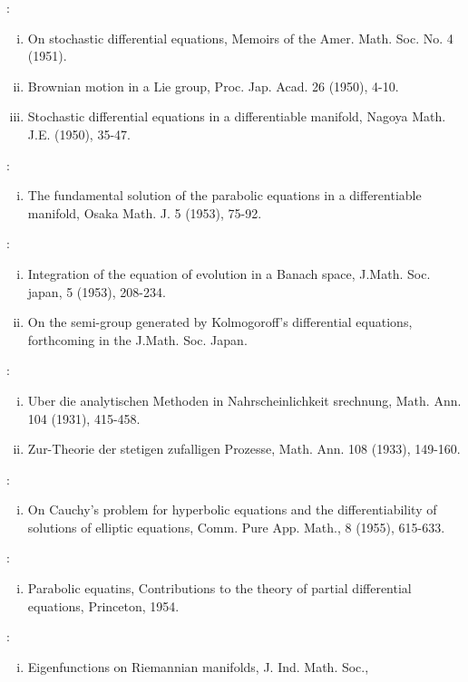 \begin{thebibliography}{99}
\begin{enumerate}[(i)]
 \end{enumerate}
: 
 \begin{enumerate}[(i)]
 \item On stochastic differential equations, Memoirs of the
  Amer. Math. Soc. No. 4 (1951). 
 \item Brownian motion in a Lie group, Proc. Jap. Acad. 26 (1950), 4-10.
 \item Stochastic differential equations in a differentiable
  manifold, Nagoya Math. J.E. (1950), 35-47. 
 \end{enumerate}
: 
 \begin{enumerate}[(i)]
 \item The fundamental solution of the parabolic equations in a
  differentiable manifold, Osaka Math. J. 5 (1953), 75-92. 
 \end{enumerate}
: 
 \begin{enumerate}[(i)]
 \item Integration of the equation of evolution in a Banach space,
  J.Math. Soc. japan, 5 (1953), 208-234. 
 \item On the semi-group generated by Kolmogoroff's differential
  equations, forthcoming in the J.Math. Soc. Japan. 
 \end{enumerate}
:\pageoriginale 
 \begin{enumerate}[(i)]
 \item Uber die analytischen Methoden in Nahrscheinlichkeit
  srechnung, Math. Ann. 104 (1931), 415-458. 
 \item Zur-Theorie der stetigen zufalligen Prozesse, Math. Ann. 108
  (1933), 149-160. 
 \end{enumerate}
: 
 \begin{enumerate}[(i)]
 \item On Cauchy's problem for hyperbolic equations and the
  differentiability of solutions of elliptic equations, Comm. Pure
  App. Math., 8 (1955), 615-633. 
 \end{enumerate}
: 
 \begin{enumerate}[(i)]
 \item Parabolic equatins, Contributions to the theory of partial
  differential equations, Princeton, 1954. 
 \end{enumerate}
: 
 \begin{enumerate}[(i)]
 \item Eigenfunctions on Riemannian manifolds, J. Ind. Math. Soc.,

\end{enumerate}
\end{thebibliography}
